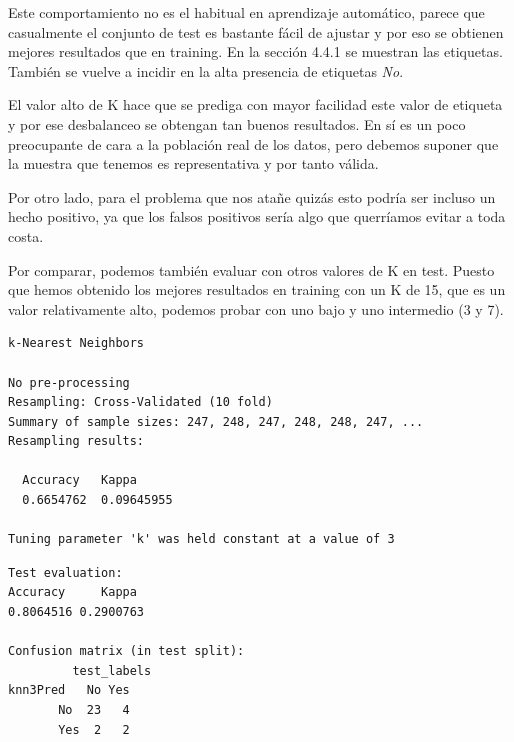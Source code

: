 Este comportamiento no es el habitual en aprendizaje automático, parece que casualmente el conjunto de test es bastante fácil de ajustar y por eso se obtienen mejores resultados que en training.
En la sección 4.4.1 se muestran las etiquetas. También se vuelve a incidir en la alta presencia de etiquetas \textit{No}.

\vspace{\baselineskip}

El valor alto de K hace que se prediga con mayor facilidad este valor de etiqueta y por ese desbalanceo se obtengan tan buenos resultados. En sí es un poco preocupante de cara a la población real de los datos, pero debemos suponer que la muestra que tenemos es representativa y por tanto válida.

\vspace{\baselineskip}

Por otro lado, para el problema que nos atañe quizás esto podría ser incluso un hecho positivo, ya que los falsos positivos sería algo que querríamos evitar a toda costa.

\newpage

Por comparar, podemos también evaluar con otros valores de K en test. Puesto que hemos obtenido los mejores resultados en training con un K de 15, que es un valor relativamente alto, podemos probar con uno bajo y uno intermedio (3 y 7).

\begin{verbatim}
k-Nearest Neighbors

No pre-processing
Resampling: Cross-Validated (10 fold) 
Summary of sample sizes: 247, 248, 247, 248, 248, 247, ... 
Resampling results:

  Accuracy   Kappa     
  0.6654762  0.09645955

Tuning parameter 'k' was held constant at a value of 3
\end{verbatim}

\begin{verbatim}
Test evaluation:
Accuracy     Kappa 
0.8064516 0.2900763 

Confusion matrix (in test split):
         test_labels
knn3Pred   No Yes
       No  23   4
       Yes  2   2
\end{verbatim}

